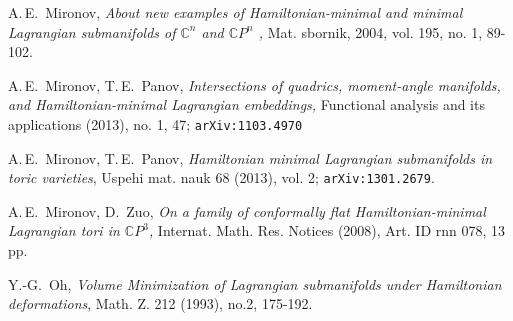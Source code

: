 \documentclass[jsg]{IP_v1_forauthors}
\theoremstyle{definition}
\numberwithin{equation}{section}
\begin{document}
\begin{thebibliography}{16}
A.\,E.~Mironov, { \it About new examples of Hamiltonian-minimal and minimal Lagrangian submanifolds of ${\mathbb C}^n$ and ${\mathbb C}P^n$ ,} Mat. sbornik, 2004,   vol. 195, no. 1, 89-102.

A.\,E.~Mironov, T.\,E.~Panov, { \it Intersections of quadrics, moment-angle manifolds, and Hamiltonian-minimal Lagrangian embeddings,} Functional analysis and its applications  (2013), no. 1, 47; {{\tt arXiv:1103.4970 }}

A.\,E.~Mironov, T.\,E.~Panov, { \it Hamiltonian minimal Lagrangian submanifolds in toric varieties}, Uspehi mat. nauk 68 (2013), vol. 2; {{\tt arXiv:1301.2679}}.

A.\,E.~Mironov, D.~Zuo, { \it On a family of conformally flat Hamiltonian-minimal Lagrangian tori in $\mathbb{C}P^3$,}  Internat. Math. Res. Notices (2008), Art. ID rnn 078, 13 pp.

Y.-G.~Oh, { \it Volume Minimization of Lagrangian submanifolds under Hamiltonian deformations}, Math. Z. 212 (1993), no.2, 175-192.

\end{thebibliography}

\address{Lomonosov Moscow State University}


\end{document}
